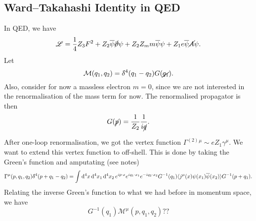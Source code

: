 \subsection{Ward--Takahashi Identity in QED}%
\label{sub:ward_takahashi_identity_in_qed}

In QED, we have
\begin{equation}
  \mathscr{L} = \frac{1}{4} Z_3 F^2 + Z_2 \overline{\psi}{} \cancel{\partial} \psi + Z_2 Z_m m \overline{\psi}{} \psi + Z_1 e \overline{\psi}{} \cancel{A} \psi.
\end{equation}
Let 
\begin{equation}
  \mathcal{M}(q_1, q_2) = \delta\hspace*{-0.2em}\bar{}\hspace*{0.2em}^4(q_1 - q_2) G(\cancel{q_1}).
\end{equation}
Also, consider for now a massless electron $m = 0$, since we are not interested in the renormalisation of the mass term for now.
The renormalised propagator is then
\begin{equation}
  G(\cancel{p}) = \frac{1}{Z_2} \frac{1}{i \cancel{q}}.
\end{equation}

After one-loop renormalisation, we got the vertex function $ \Gamma^{(2)}{}^{\mu} \sim e Z_1 \gamma^{\mu}.$
We want to extend this vertex function to off-shell.
This is done by taking the Green's function and amputating (see notes)
\begin{equation}
  \Gamma^{\mu}(p, q_1, q_2) \delta\hspace*{-0.2em}\bar{}\hspace*{0.2em}^4(p + q_1 - q_2) = \int \dd[4]{x} \dd[4]{x_1} \dd[4]{x_2} e^{i p \cdot x} e^{i q_1 \cdot x_1} e^{-i q_2 \cdot x_2} G^{-1} (q_1) \langle j^{\mu}(x) \psi(x_1) \overline{\psi}{}(x_2) \rangle G^{-1} (p + q_1).
\end{equation}
Relating the inverse Green's function to what we had before in momentum space, we have
\begin{equation}
  G^{-1}(q_1) \mathcal{M}^{\mu}(p, q_1, q_2) ??
\end{equation}

